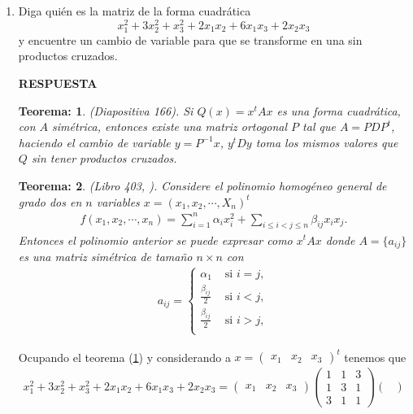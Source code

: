 \documentclass[11pt,letterpaper]{article}
\newcommand{\res}{\textbf{RESPUESTA}\\}
\newtheorem{thmt}{Teorema:}
\begin{document}
\begin{enumerate}
\item Diga quién es la matriz de la forma cuadrática 
$$x_1^2+3x_2^2+x_3^2+2x_1x_2+6x_1x_3+2x_2x_3$$
y encuentre un cambio de variable para que se transforme en una sin productos cruzados.

\res \begin{framed}
    \begin{thmt} \label{t_cambio_variable}
	(Diapositiva 166). Si $Q(x)=x^tAx$ es una forma cuadrática, con $A$ simétrica, entonces existe una matriz ortogonal $P$ tal que $A=PDP^t$, haciendo el cambio de variable $y=P^{-1}x$, $y^tDy$ toma los mismos valores que $Q$ sin tener productos cruzados.
	    \end{thmt}
\end{framed}
\begin{framed}
    \begin{thmt} \label{t_igualdad_cuadratica}
	(Libro 403, ). Considere el polinomio homogéneo general de grado dos en $n$ variables $x = (x_1, x_2,\cdots, X_n )^t$ 
\begin{align*}
f(x_1,x_2,\cdots , x_n)=\sum_{i=1}^n \alpha_ix_i^2+\sum_{i\leq i < j\leq n} \beta_{ij}x_i x_j.
\end{align*}	
	Entonces el polinomio anterior se puede expresar como $x^tAx$ donde $A=\{a_{ij}\}$ es una matriz simétrica de tamaño $n \times n$ con 
	\begin{align*}
	a_{ij} =\left\{\begin{array}{cc}
	\alpha_1 & \text{ si } i=j,\\
	\frac{\beta_{ij}}{2} & \text{ si } i<j,\\
	\frac{\beta_{ij}}{2} & \text{ si } i>j,\\
\end{array}	 \right.
	\end{align*}
	    \end{thmt}
\end{framed}
Ocupando el teorema (\ref{t_cambio_variable}) y  considerando a $x=\begin{pmatrix}
x_1 & x_2 & x_3
\end{pmatrix}^t$ tenemos que 
\begin{align*}
x_1^2+3x_2^2+x_3^2+2x_1x_2+6x_1x_3+2x_2x_3 = \begin{pmatrix}
x_1 & x_2 & x_3
\end{pmatrix} \begin{pmatrix}
1 & 1 & 3\\
1 & 3 & 1\\
3 & 1 & 1 
\end{pmatrix}\begin{pmatrix}

\end{pmatrix}
\end{align*}
\end{enumerate}
\end{document}
